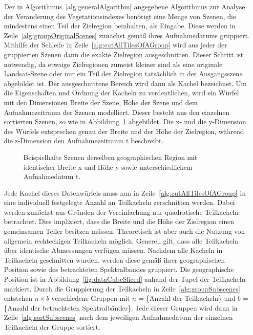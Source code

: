 Der in Algorithmus~\ref{alg:generalAlgorithm} angegebene Algorithmus zur Analyse der Veränderung des Vegetationsindexes benötigt eine Menge von Szenen, die mindestens einen Teil der Zielregion beinhalten, als Eingabe. Diese werden in Zeile~\ref{alg:groupOriginalScenes} zunächst gemäß ihres Aufnahmedatums gruppiert. Mithilfe der Schleife in Zeile~\ref{alg:cutAllTilesOfAGroup} wird aus jeder der gruppierten Szenen dann die exakte Zielregion ausgeschnitten. Dieser Schritt ist notwendig, da etwaige Zielregionen zumeist kleiner sind als eine originale Landsat-Szene oder nur ein Teil der Zielregion tatsächlich in der Ausgangsszene abgebildet ist. Der ausgeschnittene Bereich wird dann als Kachel bezeichnet. Um die Eigenschaften und Ordnung der Kacheln zu verdeutlichen, wird ein Würfel mit den Dimensionen Breite der Szene, Höhe der Szene und dem Aufnahmezeitraum der Szenen modelliert. Dieser besteht aus den einzelnen sortierten Szenen, so wie in Abbildung~\ref{fig:dataCubeOriginal} abgebildet. Die x- und die y-Dimension des Würfels entsprechen genau der Breite und der Höhe der Zielregion, während die z-Dimension den Aufnahmezeitraum t beschreibt.

\begin{figure}[H]
\centering

\caption{Beispielhafte Szenen derselben geographischen Region mit identischer Breite x und Höhe y sowie unterschiedlichem Aufnahmedatum t.} 
\label{fig:dataCubeOriginal}
\end{figure}

Jede Kachel dieses Datenwürfels muss nun in Zeile~\ref{alg:cutAllTilesOfAGroup} in eine individuell festgelegte Anzahl an Teilkacheln zerschnitten werden. Dabei werden zunächst aus Gründen der Vereinfachung nur quadratische Teilkacheln betrachtet. Dies impliziert, dass die Breite und die Höhe der Zielregion einen gemeinsamen Teiler besitzen müssen. Theoretisch ist aber auch die Nutzung von allgemein rechteckigen Teilkacheln möglich. Generell gilt, dass alle Teilkacheln über identische Abmessungen verfügen müssen. Nachdem alle Kacheln in Teilkacheln geschnitten wurden, werden diese gemäß ihrer geographischen Position sowie des betrachteten Spektralbandes gruppiert. Die geographische Position ist in Abbildung~\ref{fig:dataCubeSliced} anhand der Tupel der Teilkacheln markiert. Durch die Gruppierung der Teilkacheln in Zeile~\ref{alg:groupSubscenes} entstehen \(n \times b \) verschiedene Gruppen mit $n$ = \{Anzahl der Teilkacheln\} und $b$ = \{Anzahl der betrachteten Spektralbänder\}. Jede dieser Gruppen wird dann in Zeile~\ref{alg:sortSubscenes} nach dem jeweiligen Aufnahmedatum der einzelnen Teilkacheln der Gruppe sortiert. 

